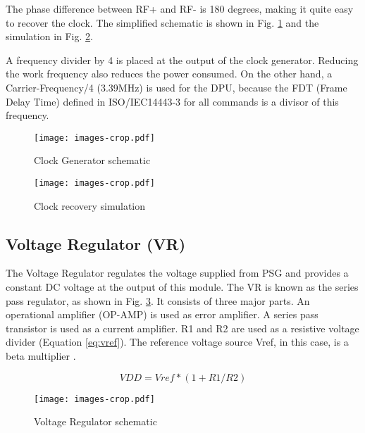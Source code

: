 The phase difference between RF+ and RF- is 180 degrees, making it quite easy to recover the clock. The simplified schematic is shown in Fig. \ref{fig:clk} and the simulation in Fig. \ref{fig:clk_sim}.

A frequency divider by 4 is placed at the output of the clock generator. Reducing the work frequency also reduces the power consumed. On the other hand, a Carrier-Frequency/4 (3.39MHz) is used for the DPU, because the FDT (Frame Delay Time) defined in ISO/IEC14443-3 for all commands is a divisor of this frequency.
 

\begin{figure}[]
  \centering
  \texttt{[image: images-crop.pdf]}
  \caption{Clock Generator schematic}
  \label{fig:clk}
\end{figure}

\begin{figure}[]
  \centering
  \texttt{[image: images-crop.pdf]}
  \caption{Clock recovery simulation}
  \label{fig:clk_sim}
\end{figure}


\subsection{Voltage Regulator (VR)}

The Voltage Regulator \cite{rfid_ldo} regulates the voltage supplied from PSG and provides a constant DC voltage at the output of this module. The VR is known as the series pass regulator, as shown in Fig. \ref{fig:ldo}. It consists of three major parts. An operational amplifier (OP-AMP) is used as error amplifier. A series pass transistor is used as a current amplifier. R1 and R2 are used as a resistive voltage divider (Equation \ref{eq:vref}). The reference voltage source Vref, in this case, is a beta multiplier \cite{panadero}. 

\begin{equation} \label{eq:vref}
VDD = Vref*(1+R1/R2)
\end{equation}


\begin{figure}[]
  \centering
  \texttt{[image: images-crop.pdf]}
  \caption{Voltage Regulator schematic}
  \label{fig:ldo}
\end{figure}

